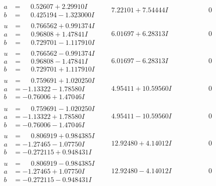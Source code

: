 \documentclass[1p]{elsarticle_modified}
\theoremstyle{definition}
\begin{document}
$$\begin{array}{c|c|c}
\begin{aligned}
a &= \phantom{-}0.52607 + 2.29910 I \\
b &= \phantom{-}0.425194 - 1.323000 I\end{aligned}
 & \phantom{-}7.22101 + 7.54444 I & \phantom{-0.000000 } 0 \\ \hline\begin{aligned}
u &= \phantom{-}0.766562 + 0.991374 I \\
a &= \phantom{-}0.96808 + 1.47841 I \\
b &= \phantom{-}0.729701 - 1.117910 I\end{aligned}
 & \phantom{-}6.01697 + 6.28313 I & \phantom{-0.000000 } 0 \\ \hline\begin{aligned}
u &= \phantom{-}0.766562 - 0.991374 I \\
a &= \phantom{-}0.96808 - 1.47841 I \\
b &= \phantom{-}0.729701 + 1.117910 I\end{aligned}
 & \phantom{-}6.01697 - 6.28313 I & \phantom{-0.000000 } 0 \\ \hline\begin{aligned}
u &= \phantom{-}0.759691 + 1.020250 I \\
a &= -1.13322 - 1.78580 I \\
b &= -0.76006 + 1.47046 I\end{aligned}
 & \phantom{-}4.95411 + 10.59560 I & \phantom{-0.000000 } 0 \\ \hline\begin{aligned}
u &= \phantom{-}0.759691 - 1.020250 I \\
a &= -1.13322 + 1.78580 I \\
b &= -0.76006 - 1.47046 I\end{aligned}
 & \phantom{-}4.95411 - 10.59560 I & \phantom{-0.000000 } 0 \\ \hline\begin{aligned}
u &= \phantom{-}0.806919 + 0.984385 I \\
a &= -1.27465 - 1.07750 I \\
b &= -0.272115 + 0.948431 I\end{aligned}
 & \phantom{-}12.92480 + 4.14012 I & \phantom{-0.000000 } 0 \\ \hline\begin{aligned}
u &= \phantom{-}0.806919 - 0.984385 I \\
a &= -1.27465 + 1.07750 I \\
b &= -0.272115 - 0.948431 I\end{aligned}
 & \phantom{-}12.92480 - 4.14012 I & \phantom{-0.000000 } 0\\

\end{array}$$
\end{document}
